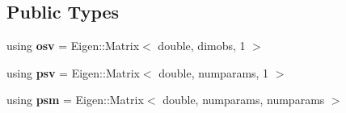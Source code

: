 \subsection*{Public Types}
\begin{DoxyCompactItemize}
\item 
\mbox{\label{classada__pmmh__mvn_a2be52b9b18ebc707d2a01186ead69a79}} 
using {\bfseries osv} = Eigen\+::\+Matrix$<$ double, dimobs, 1 $>$
\item 
\mbox{\label{classada__pmmh__mvn_af4705162cb4330ad6d92ed2ba5ddc3b1}} 
using {\bfseries psv} = Eigen\+::\+Matrix$<$ double, numparams, 1 $>$
\item 
\mbox{\label{classada__pmmh__mvn_a795deffec8002e5b307b197c22822490}} 
using {\bfseries psm} = Eigen\+::\+Matrix$<$ double, numparams, numparams $>$
\end{DoxyCompactItemize}
